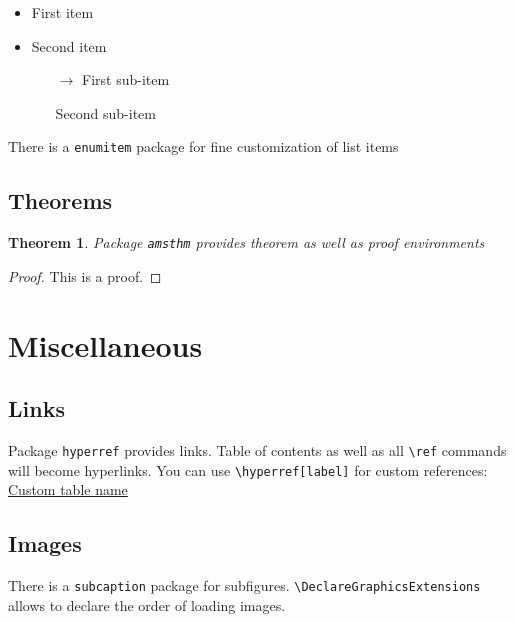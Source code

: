 \documentclass[a4paper]{article}
\newcommand{\sign}[1]{\texttt{\textbackslash{#1}}}
\newtheorem{thm}{Theorem}
\begin{document}
\begin{itemize}
    \item First item
    \item Second item
    \begin{itemize}
        \item[$\rightarrow$] First sub-item
        \item[] Second sub-item
    \end{itemize}
\end{itemize}

There is a \texttt{enumitem} package for fine customization of list items 

\subsection{Theorems}

\begin{thm}
    Package \texttt{amsthm} provides theorem as well as proof environments
\end{thm}

\begin{proof}
This is a proof.
\end{proof}

\section{Miscellaneous}

\subsection{Links}
Package \texttt{hyperref} provides links. Table of contents as well as all \sign{ref\string{\string}} commands will become hyperlinks. You can use \sign{hyperref[label]} for custom references: \hyperref[tab:my_label]{Custom table name}

\subsection{Images}

There is a \texttt{subcaption} package for subfigures. \sign{DeclareGraphicsExtensions} allows to declare the order of loading images.    
\end{document}
